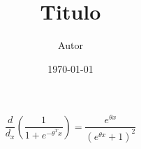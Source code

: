 \documentclass[12pt]{article}
\title{Titulo}
\author{Autor}
\date{\today}
\begin{document}
$$\frac{d}{d_x}(\frac{1}{1+e^{-\theta^Tx}}) = \frac{e^{\theta x}}{(e^{\theta x}+1)^2}$$
\end{document}
